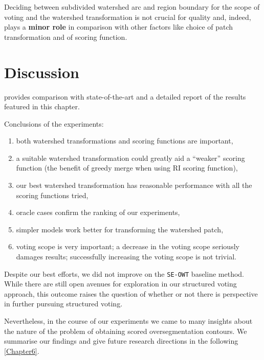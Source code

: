 Deciding between subdivided watershed arc and region boundary for the scope of voting and the watershed transformation is not %
crucial for quality %
and, indeed, plays %
a {\bf minor role} in comparison with other factors like choice of patch transformation and of scoring function.

\section{Discussion}

 provides comparison with state-of-the-art and a detailed report of the results featured in this chapter.


Conclusions of the experiments:
\begin{enumerate}
 \item both watershed transformations and scoring functions are important,
 \item a suitable %
 watershed transformation could greatly aid a ``weaker'' scoring function (\eg the benefit of greedy merge when using RI scoring function),
 \item our best watershed transformation has reasonable performance with all the scoring functions tried,
 \item oracle cases confirm the ranking of our experiments,
 \item simpler models work better for transforming the watershed patch, %
 \item voting scope is very important; a decrease in the voting scope seriously damages results; successfully increasing the voting scope is not trivial.
\end{enumerate}

Despite our best efforts, we did not improve on the {\tt SE-OWT} baseline method. While there are still open avenues for exploration in our structured voting approach, this outcome raises the %
question of whether or not there is perspective in further pursuing structured voting. 

Nevertheless, in the course of our experiments we came to many insights about the nature of the problem of obtaining scored oversegmentation %
contours. We summarise our findings and give future research directions in the following \cref{Chapter6}.
